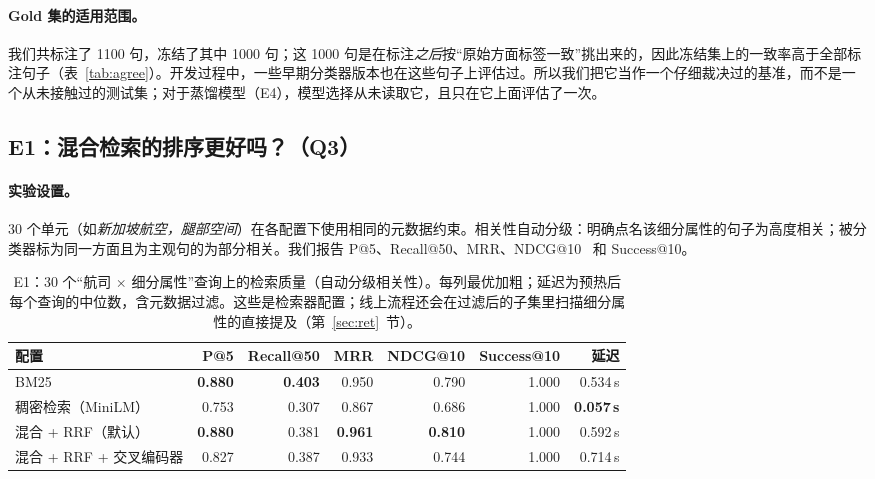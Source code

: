 \documentclass[10pt,twocolumn,a4paper]{article}
\newcommand{\sref}[1]{第~\ref{#1}~节}
\newcommand{\best}[1]{\textbf{#1}}
\begin{document}
\paragraph{Gold 集的适用范围。}我们共标注了 \num{1100} 句，冻结了其中 \num{1000} 句；这 1000 句是在标注\emph{之后}按“原始方面标签一致”挑出来的，因此冻结集上的一致率高于全部标注句子（表~\ref{tab:agree}）。开发过程中，一些早期分类器版本也在这些句子上评估过。所以我们把它当作一个仔细裁决过的基准，而不是一个从未接触过的测试集；对于蒸馏模型（E4），模型选择从未读取它，且只在它上面评估了一次。

\subsection{E1：混合检索的排序更好吗？（Q3）}
\label{sec:exp-ret}

\paragraph{实验设置。}30 个单元（如\emph{新加坡航空，腿部空间}）在各配置下使用相同的元数据约束。相关性自动分级：明确点名该细分属性的句子为高度相关；被分类器标为同一方面且为主观句的为部分相关。我们报告 P@5、Recall@50、MRR、NDCG@10~\cite{ndcg} 和 Success@10。

\begin{table}[t]
\centering\small
\caption{E1：30 个“航司 $\times$ 细分属性”查询上的检索质量（自动分级相关性）。每列最优加粗；延迟为预热后每个查询的中位数，含元数据过滤。这些是检索器配置；线上流程还会在过滤后的子集里扫描细分属性的直接提及（\sref{sec:ret}）。}
\label{tab:retrieval}
\begin{tabular}{@{}lrrrrrr@{}}
\toprule
\textbf{配置} & \textbf{P@5} & \textbf{Recall@50} & \textbf{MRR} & \textbf{NDCG@10} & \textbf{Success@10} & \textbf{延迟} \\
\midrule
BM25 & \best{0.880} & \best{0.403} & 0.950 & 0.790 & 1.000 & 0.534\,s \\
稠密检索（MiniLM） & 0.753 & 0.307 & 0.867 & 0.686 & 1.000 & \best{0.057\,s} \\
\rowcolor{shade} 混合 + RRF（默认） & \best{0.880} & 0.381 & \best{0.961} & \best{0.810} & 1.000 & 0.592\,s \\
混合 + RRF + 交叉编码器 & 0.827 & 0.387 & 0.933 & 0.744 & 1.000 & 0.714\,s \\
\bottomrule
\end{tabular}
\end{table}
\end{document}
